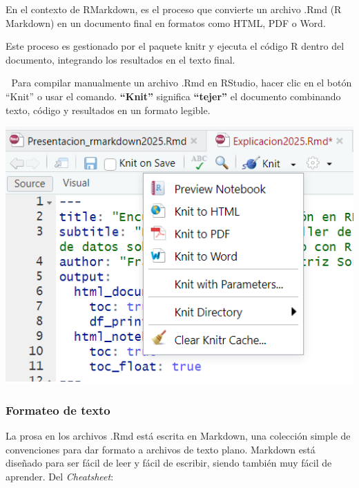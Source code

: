 \documentclass[
]{article}
\begin{document}
En el contexto de RMarkdown, es el proceso que convierte un archivo .Rmd
(R Markdown) en un documento final en formatos como HTML, PDF o Word.

Este proceso es gestionado por el paquete knitr y ejecuta el código R
dentro del documento, integrando los resultados en el texto final.

🔹 Para compilar manualmente un archivo .Rmd en RStudio, hacer clic en
el botón ``Knit'' o usar el comando. \textbf{``Knit''} significa
\textbf{``tejer''} el documento combinando texto, código y resultados en
un formato legible.

\includegraphics{img/knit.png}

\subsubsection{Formateo de texto}\label{formateo-de-texto}

La prosa en los archivos .Rmd está escrita en Markdown, una colección
simple de convenciones para dar formato a archivos de texto plano.
Markdown está diseñado para ser fácil de leer y fácil de escribir,
siendo también muy fácil de aprender. Del \emph{Cheatsheet}:
\end{document}
